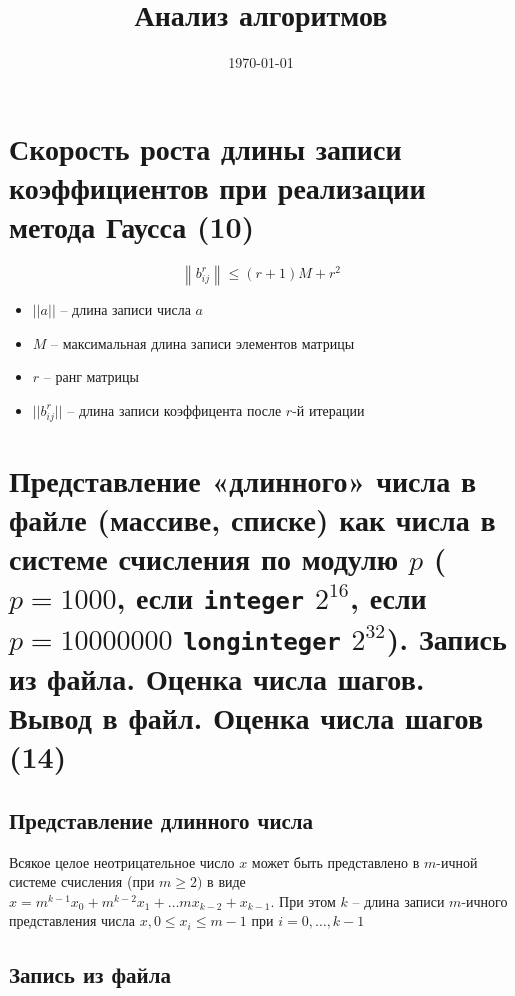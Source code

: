 \documentclass[40pt]{article}
\title{Анализ алгоритмов}
\date{\today}
\begin{document}
\maketitle

\tableofcontents
\newpage







\section{Скорость роста длины записи коэффициентов при реализации метода Гаусса (10)}

$$\left\|b_{i j}^{r}\right\| \leq(r+1) M+r^{2}$$



\begin{itemize}
	\item $||a||$ -- длина записи числа $a$
	\item $M$ -- максимальная длина записи элементов матрицы
	\item $r$ -- ранг матрицы
	\item $||b_{ij}^r||$ -- длина записи коэффицента после $r$-й итерации
\end{itemize}


\section{Представление «длинного» числа в файле (массиве, списке) как числа в системе счисления по модулю $p$ ($p=1000$, если \texttt{integer} $2^{16}$, если $p=10 000 000$ \texttt{longinteger} $2^{32}$). Запись из файла. Оценка числа шагов. Вывод в файл. Оценка числа шагов (14)}


\subsection{Представление длинного числа}

Всякое целое неотрицательное число $x$ может быть представлено в $m$-ичной системе счисления (при $m \geq 2)$ в виде $x=m^{k-1} x_{0}+m^{k-2} x_{1}+\ldots m x_{k-2}+x_{k-1}.$ При этом $k$ -- длина записи $m$-ичного представления числа $x, 0 \leq x_{i} \leq m-1$ при $i=0, \ldots, k-1$

\subsection{Запись из файла}
\end{document}
